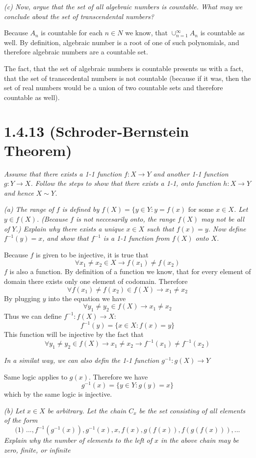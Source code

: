 \documentclass[11pt,oneside,titlepage]{article}
\begin{document}
\textit{(c) Now, argue that the set of all algebraic numbers is countable. What may we
  conclude about the set of transcendental numbers?}

Because $A_n$ is countable for each $n \in N$ we know, that
$\cup^{\infty}_{n = 1}A_n$ is countable as well. By definition, algebraic number
is a root of one of such polynomials, and therefore algebraic numbers are a countable
set.

The fact, that the set of algebraic numbers is countable presents us with a fact, that
the set of transcedental numbers is not countable (because if it was, then the set
of real numbers would be a union of two countable sets and therefore countable as
well).

\section*{1.4.13 (Schroder-Bernstein Theorem)}
\textit{Assume that there exists a 1-1 function $f: X \to Y$ and another 1-1 function
  $g: Y \to X$. Follow the steps to show that there exists a 1-1, onto function $h: X \to Y$
  and hence $X \sim Y$.}

\textit{(a) The range of $f$ is defined by $f(X) = \{y \in Y: y = f(x) \text{ for some }
  x \in X$. Let $y \in f(X)$. (Because $f$ is not neccesarily onto, the range $f(X)$
  may not be all of $Y$.) Explain why there exists a unique $x \in X$ such that $f(x) = y$.
  Now define $f^{-1}(y) = x$, and show that $f^{-1}$ is a 1-1 function from $f(X)$ onto $X$.}

Because $f$ is given to be injective, it is true that
$$\forall x_1 \neq x_2 \in X \to  f(x_1) \neq f(x_2)$$
$f$ is also a function.  By definition of a function we know, that for every element
of domain there exists only one element of codomain. Therefore
$$\forall f(x_1) \neq f(x_2) \in f(X) \to  x_1 \neq x_2$$
By plugging $y$ into the equation we have
$$\forall y_1 \neq y_2  \in f(X) \to  x_1 \neq x_2$$
Thus we can define $f^{-1}: f(X) \to X$:
$$f^{-1}(y) = \{x \in X: f(x) = y\}$$
This function will be injective by the fact that
$$\forall y_1 \neq y_2  \in f(X) \to  x_1 \neq x_2 \to f^{-1}(x_1) \neq f^{-1}(x_2)$$

\textit{In a similat way, we can also defin the 1-1 function $g^{-1}: g(X) \to Y$}

Same logic applies to $g(x)$. Therefore we have
$$g^{-1}(x) = \{y \in Y: g(y) = x\}$$
which by the same logic is injective.

\textit{(b) Let $x \in X$ be arbitrary. Let the chain $C_x$ be the set consisting of all
  elements of the form }
$$\text{(1) }..., f^{-1}(g^{-1}(x)), g^{-1}(x), x, f(x), g(f(x)), f(g(f(x))), ...$$
\textit{Explain why the number of elements to the left of $x$ in the above chain may be zero,
  finite, or infinite}
\end{document}
